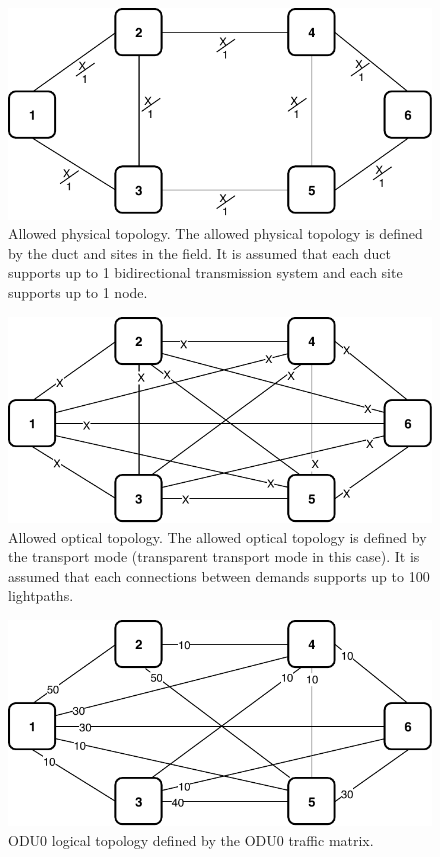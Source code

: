\begin{figure}[h!]
\centering
\includegraphics[width=12cm]{sdf/ilp/transparent_survivability/figures/allowed_physical_topology}
\caption{Allowed physical topology. The allowed physical topology is defined by the duct and sites in the field. It is assumed that each duct supports up to 1 bidirectional transmission system and each site supports up to 1 node.}
\label{allowed2_physical_medium}
\end{figure}

\vspace{11pt}
\begin{figure}[h!]
\centering
\includegraphics[width=12cm]{sdf/ilp/transparent_survivability/figures/allowed_optical_topology}
\caption{Allowed optical topology. The allowed optical topology is defined by the transport mode (transparent transport mode in this case). It is assumed that each connections between demands supports up to 100 lightpaths.}
\label{allowed2_optical_medium}
\end{figure}

\newpage
\begin{figure}[h!]
\centering
\includegraphics[width=12cm]{sdf/ilp/transparent_survivability/figures/logical_topology_ODU0_medium}
\caption{ODU0 logical topology defined by the ODU0 traffic matrix.}
\label{logical2_ODU0_medium}
\end{figure}

